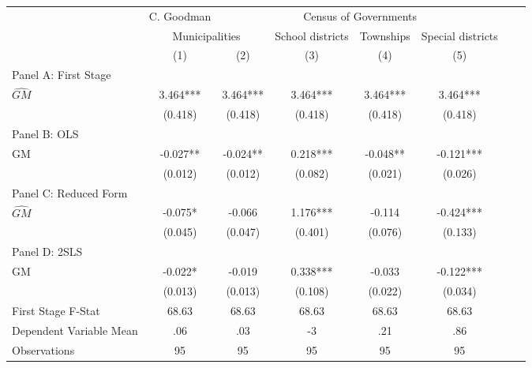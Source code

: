    \begin{tabular}{l*{7}{c}} \toprule
&\multicolumn{1}{c}{C. Goodman}&\multicolumn{4}{c}{Census of Governments}\\\cmidrule(lr){2-2}\cmidrule(lr){3-6}
&\multicolumn{2}{c}{Municipalities}&\multicolumn{1}{c}{School districts}&\multicolumn{1}{c}{Townships}&\multicolumn{1}{c}{Special districts}\\\cmidrule(lr){2-3}\cmidrule(lr){4-6}
&\multicolumn{1}{c}{(1)}&\multicolumn{1}{c}{(2)}&\multicolumn{1}{c}{(3)}&\multicolumn{1}{c}{(4)}&\multicolumn{1}{c}{(5)}\\
\cmidrule(lr){1-6}
\multicolumn{5}{l}{Panel A: First Stage}\\
\cmidrule(lr){1-6}
$\widehat{GM}$  &    3.464***&    3.464***&    3.464***&    3.464***&    3.464***\\
                &  (0.418)   &  (0.418)   &  (0.418)   &  (0.418)   &  (0.418)   \\
\cmidrule(lr){1-6}
\multicolumn{5}{l}{Panel B: OLS}\\
\cmidrule(lr){1-6}
GM              &   -0.027** &   -0.024** &    0.218***&   -0.048** &   -0.121***\\
                &  (0.012)   &  (0.012)   &  (0.082)   &  (0.021)   &  (0.026)   \\
\cmidrule(lr){1-6}
\multicolumn{5}{l}{Panel C: Reduced Form}\\
\cmidrule(lr){1-6}
$\widehat{GM}$  &   -0.075*  &   -0.066   &    1.176***&   -0.114   &   -0.424***\\
                &  (0.045)   &  (0.047)   &  (0.401)   &  (0.076)   &  (0.133)   \\
\cmidrule(lr){1-6}
\multicolumn{5}{l}{Panel D: 2SLS}\\
\cmidrule(lr){1-6}
GM              &   -0.022*  &   -0.019   &    0.338***&   -0.033   &   -0.122***\\
                &  (0.013)   &  (0.013)   &  (0.108)   &  (0.022)   &  (0.034)   \\
\midrule
First Stage F-Stat&    68.63   &    68.63   &    68.63   &    68.63   &    68.63   \\
Dependent Variable Mean&      .06   &      .03   &       -3   &      .21   &      .86   \\
Observations    &       95   &       95   &       95   &       95   &       95   \\
       \bottomrule \end{tabular}
